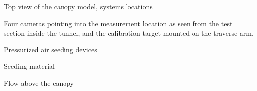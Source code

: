 \documentclass[aspectratio=43]{beamer}
\begin{document}
\begin{frame}{Top view of the canopy model, systems locations}
\centering{}
\end{frame}


\begin{frame}
\begin{multicols}{2}
\centering
{}
\end{multicols}
\begin{cardTiny}
Four cameras pointing into the measurement location as seen from the test section inside the tunnel, and the calibration target mounted on the traverse arm.
\end{cardTiny}
\end{frame}

%

\begin{frame}{Pressurized air seeding devices}
\end{frame}

\begin{frame}{Seeding material}
\centering{}
\end{frame}





\begin{frame}{Flow above the canopy}
\centering
{}
\end{frame}
\end{document}
